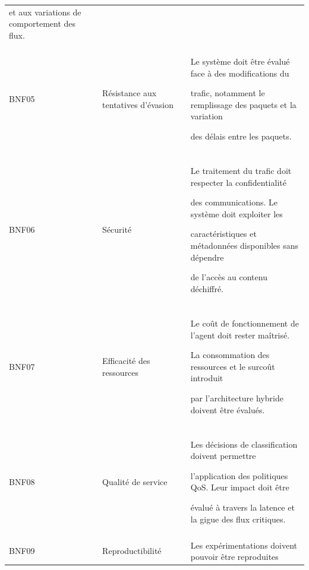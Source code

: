 \begin{table}[H]
\begin{tabularx}{\textwidth}{|p{1.4cm}|p{3.2cm}|Y|}
et aux variations de comportement des flux. \\\\

\hline



BNF05 & Résistance aux tentatives d'évasion &

Le système doit être évalué face à des modifications du

trafic, notamment le remplissage des paquets et la variation

des délais entre les paquets. \\\\

\hline



BNF06 & Sécurité &

Le traitement du trafic doit respecter la confidentialité

des communications. Le système doit exploiter les

caractéristiques et métadonnées disponibles sans dépendre

de l'accès au contenu déchiffré. \\\\

\hline



BNF07 & Efficacité des ressources &

Le coût de fonctionnement de l'agent doit rester maîtrisé.

La consommation des ressources et le surcoût introduit

par l'architecture hybride doivent être évalués. \\\\

\hline



BNF08 & Qualité de service &

Les décisions de classification doivent permettre

l'application des politiques QoS. Leur impact doit être

évalué à travers la latence et la gigue des flux critiques. \\\\

\hline



BNF09 & Reproductibilité &

Les expérimentations doivent pouvoir être reproduites


\end{tabularx}
\end{table}
